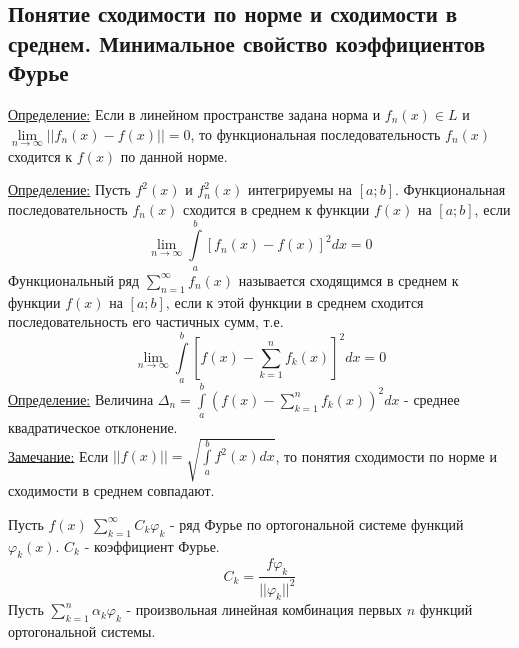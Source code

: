 \documentclass[12pt]{article}
\let\oldint\int
\let\oldsum\sum
\let\oldlim\lim
\renewcommand{\int}{\oldint\limits}
\renewcommand{\sum}{\oldsum\limits}
\renewcommand{\lim}{\oldlim\limits}
\begin{document}
    \subsection{Понятие сходимости по норме и сходимости в среднем. Минимальное свойство коэффициентов Фурье}\noindent
    \underline{Определение:} Если в линейном пространстве задана норма и $f_n(x) \in L$ и $\lim_{n \to \infty} ||f_n(x) - f(x)|| = 0$, то функциональная последовательность ${f_n(x)}$ сходится к $f(x)$ по данной норме.\par\noindent
    \underline{Определение:} Пусть $f^2(x)$ и $f^2_n(x)$ интегрируемы на $[a;b]$. Функциональная последовательность ${f_n(x)}$ сходится в среднем к функции $f(x)$ на $[a; b]$, если 
    \[\lim_{n \to \infty} \int_{a}^{b} [ f_n(x) - f(x) ]^2 dx = 0\]
    Функциональный ряд $\sum_{n = 1}^{\infty} f_n(x)$ называется сходящимся в среднем к функции $f(x)$ на $[a; b]$, если к этой функции в среднем сходится последовательность его частичных сумм, т.е. 
    \[\lim_{n \to \infty} \int_{a}^{b} [ f(x) - \sum_{k = 1}^{n} f_k(x) ]^2 dx = 0\]
    \underline{Определение:} Величина $\Delta_n = \int_{a}^{b} (f(x) - \sum_{k=1}^{n} f_k(x))^2dx$ - среднее квадратическое отклонение.\\
    \underline{Замечание:} Если $||f(x)|| = \sqrt{\int_{a}^{b} f^2(x)dx}$, то понятия сходимости по норме и сходимости в среднем совпадают.\par\noindent
    Пусть $f(x) ~ \sum_{k=1}^{\infty} C_k \varphi_k$ - ряд Фурье по ортогональной системе функций $\varphi_k(x)$. $C_k$ - коэффициент Фурье.\\
    \[C_k = \frac{f \varphi_k}{||\varphi_k||^2}\]
    Пусть $\sum_{k=1}^{n} \alpha_k \varphi_k$ - произвольная линейная комбинация первых $n$ функций ортогональной системы.\par\noindent
\end{document}
